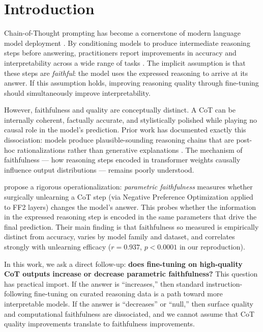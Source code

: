 \documentclass[11pt]{article}
\begin{document}
\section{Introduction}
\label{sec:intro}

Chain-of-Thought prompting has become a cornerstone of modern language model
deployment \citep{wei2022cot}. By conditioning models to produce intermediate
reasoning steps before answering, practitioners report improvements in
accuracy and interpretability across a wide range of tasks
\citep{kojima2022zeroshot,lightman2023prm}. The implicit assumption is that
these steps are \emph{faithful}: the model uses the expressed reasoning to
arrive at its answer. If this assumption holds, improving reasoning quality
through fine-tuning should simultaneously improve interpretability.

However, faithfulness and quality are conceptually distinct. A CoT can be
internally coherent, factually accurate, and stylistically polished while
playing no causal role in the model's prediction. Prior work has documented
exactly this dissociation: models produce plausible-sounding reasoning chains
that are post-hoc rationalizations rather than generative explanations
\citep{turpin2023faithfulness,lanham2023measuring,lyu2023faithful}. The
mechanism of faithfulness --- how reasoning steps encoded in transformer
weights causally influence output distributions --- remains poorly understood.

\citet{tutek2025faithfulness} propose a rigorous operationalization:
\emph{parametric faithfulness} measures whether surgically unlearning a CoT
step (via Negative Preference Optimization applied to FF2 layers) changes the
model's answer. This probes whether the information in the expressed reasoning
step is encoded in the same parameters that drive the final prediction. Their
main finding is that faithfulness so measured is empirically distinct from
accuracy, varies by model family and dataset, and correlates strongly with
unlearning efficacy ($r = 0.937$, $p < 0.0001$ in our reproduction).

In this work, we ask a direct follow-up: \textbf{does fine-tuning on
high-quality CoT outputs increase or decrease parametric faithfulness?} This
question has practical import. If the answer is ``increases,'' then standard
instruction-following fine-tuning on curated reasoning data is a path toward
more interpretable models. If the answer is ``decreases'' or ``null,'' then
surface quality and computational faithfulness are dissociated, and we cannot
assume that CoT quality improvements translate to faithfulness improvements.
\end{document}

